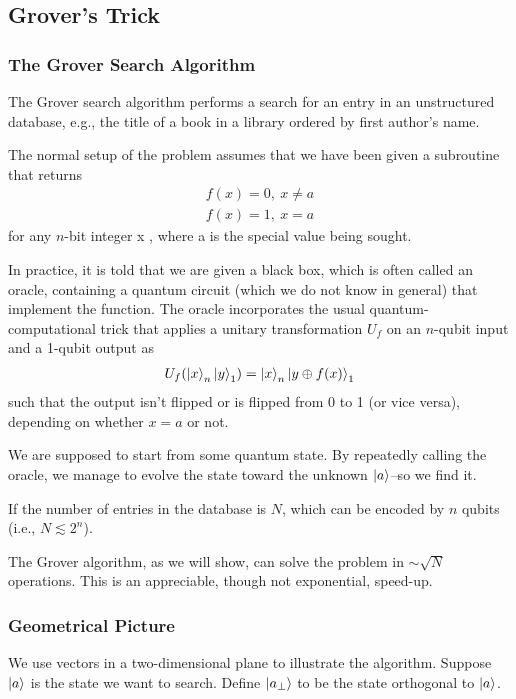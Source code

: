 \subsection{Grover's Trick}
\subsubsection{The Grover Search Algorithm}
The Grover search algorithm performs a search for an entry in an unstructured database, e.g., the title of a book in a library ordered by first author’s name.

The normal setup of the problem assumes that we have been given a subroutine that returns
\begin{align*}
    f(x)=0,\ x\ne a\\
    f(x)=1,\ x=a
\end{align*}
for any $n$-bit integer x , where a is the special value being sought.

In practice, it is told that we are given a black box, which is often called an oracle, containing a quantum circuit (which we do not know in general) that implement the function. The oracle incorporates the usual quantum-computational trick that applies a unitary transformation $U_f$ on an $n$-qubit input and a 1-qubit output as
\begin{align*}
    U_f(\ket{x}_n\ket{y}_1)=\ket{x}_n\ket{y\oplus f(x)}_1
\end{align*}
such that the output isn't flipped or is flipped from 0 to 1 (or vice versa), depending on whether $x=a$ or not. 

We are supposed to start from some quantum state. By repeatedly calling the oracle, we manage to evolve the state toward the unknown $\ket{a}$–so we find it.

If the number of entries in the database is $N$, which can be encoded by $n$ qubits (i.e., $N \lesssim  2^n$).

The Grover algorithm, as we will show, can solve the problem in $\sim \sqrt{N}$ operations. This is an appreciable, though not exponential, speed-up.

\subsubsection{Geometrical Picture}
We use vectors in a two-dimensional plane to illustrate the algorithm. Suppose $\ket{a}$ is the state we want to search. Define $\ket{a_\perp }$ to be the state orthogonal to $\ket{a}$. 

